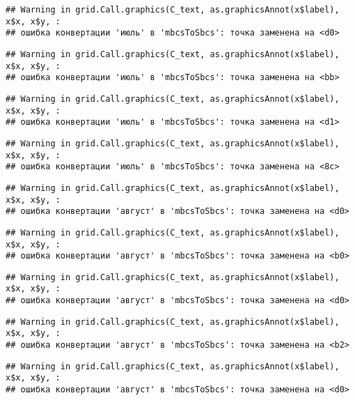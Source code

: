 \documentclass[
]{article}
\begin{document}
\begin{verbatim}
## Warning in grid.Call.graphics(C_text, as.graphicsAnnot(x$label), x$x, x$y, :
## ошибка конвертации 'июль' в 'mbcsToSbcs': точка заменена на <d0>
\end{verbatim}

\begin{verbatim}
## Warning in grid.Call.graphics(C_text, as.graphicsAnnot(x$label), x$x, x$y, :
## ошибка конвертации 'июль' в 'mbcsToSbcs': точка заменена на <bb>
\end{verbatim}

\begin{verbatim}
## Warning in grid.Call.graphics(C_text, as.graphicsAnnot(x$label), x$x, x$y, :
## ошибка конвертации 'июль' в 'mbcsToSbcs': точка заменена на <d1>
\end{verbatim}

\begin{verbatim}
## Warning in grid.Call.graphics(C_text, as.graphicsAnnot(x$label), x$x, x$y, :
## ошибка конвертации 'июль' в 'mbcsToSbcs': точка заменена на <8c>
\end{verbatim}

\begin{verbatim}
## Warning in grid.Call.graphics(C_text, as.graphicsAnnot(x$label), x$x, x$y, :
## ошибка конвертации 'август' в 'mbcsToSbcs': точка заменена на <d0>
\end{verbatim}

\begin{verbatim}
## Warning in grid.Call.graphics(C_text, as.graphicsAnnot(x$label), x$x, x$y, :
## ошибка конвертации 'август' в 'mbcsToSbcs': точка заменена на <b0>
\end{verbatim}

\begin{verbatim}
## Warning in grid.Call.graphics(C_text, as.graphicsAnnot(x$label), x$x, x$y, :
## ошибка конвертации 'август' в 'mbcsToSbcs': точка заменена на <d0>
\end{verbatim}

\begin{verbatim}
## Warning in grid.Call.graphics(C_text, as.graphicsAnnot(x$label), x$x, x$y, :
## ошибка конвертации 'август' в 'mbcsToSbcs': точка заменена на <b2>
\end{verbatim}

\begin{verbatim}
## Warning in grid.Call.graphics(C_text, as.graphicsAnnot(x$label), x$x, x$y, :
## ошибка конвертации 'август' в 'mbcsToSbcs': точка заменена на <d0>
\end{verbatim}
\end{document}
